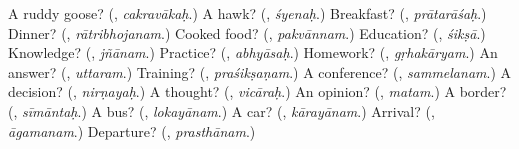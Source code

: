 \begin{tcolorbox}[breakable,colback=teal!4,colframe=teal!35!black,title={Before you move on}]
A ruddy goose? (\textbf{}, \emph{cakravākaḥ}.) A hawk? (\textbf{}, \emph{śyenaḥ}.) Breakfast? (\textbf{}, \emph{prātarāśaḥ}.) Dinner? (\textbf{}, \emph{rātribhojanam}.) Cooked food? (\textbf{}, \emph{pakvānnam}.) Education? (\textbf{}, \emph{śikṣā}.) Knowledge? (\textbf{}, \emph{jñānam}.) Practice? (\textbf{}, \emph{abhyāsaḥ}.) Homework? (\textbf{}, \emph{gṛhakāryam}.) An answer? (\textbf{}, \emph{uttaram}.) Training? (\textbf{}, \emph{praśikṣaṇam}.) A conference? (\textbf{}, \emph{sammelanam}.) A decision? (\textbf{}, \emph{nirṇayaḥ}.) A thought? (\textbf{}, \emph{vicāraḥ}.) An opinion? (\textbf{}, \emph{matam}.) A border? (\textbf{}, \emph{sīmāntaḥ}.) A bus? (\textbf{}, \emph{lokayānam}.) A car? (\textbf{}, \emph{kārayānam}.) Arrival? (\textbf{}, \emph{āgamanam}.) Departure? (\textbf{}, \emph{prasthānam}.)
\end{tcolorbox}
